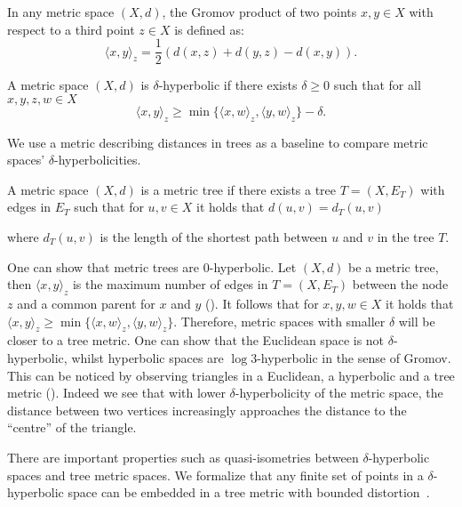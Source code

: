 \begin{definition}
    In any metric space $(X,d)$, the Gromov product of two points $x,y\in X$ with respect to a third point $z\in X$ is defined as:
    \begin{equation*}
        \langle x,y \rangle_z = \frac{1}{2}\left(d(x,z) + d(y,z) - d(x,y)\right).
    \end{equation*}
\end{definition}

\begin{definition}
    A metric space $(X,d)$ is $\delta$-hyperbolic if there exists $\delta\geq0$ such that for all $x,y,z,w\in X$
    \begin{equation*}
        \langle x,y\rangle_z \geq \min\{\langle x,w\rangle_z, \langle y, w\rangle_z\} - \delta.
    \end{equation*}
\end{definition}

We use a metric describing distances in trees as a baseline to compare metric spaces' $\delta$-hyperbolicities.

\begin{definition}
    A metric space $(X,d)$ is a metric tree if there exists a tree $T=(X,E_T)$ with edges in $E_T$ such that for $u,v\in X$ it holds that $d(u,v)=d_T(u,v)$
\end{definition}
where $d_T(u,v)$ is the length of the shortest path between $u$ and $v$ in the tree $T$. 
 


One can show that metric trees are $0$-hyperbolic. Let $(X,d)$ be a metric tree, then $\langle x, y\rangle_z$ is the maximum number of edges in $T=(X,E_T)$ between the node $z$ and a common parent for $x$ and $y$ (). It follows that for $x,y,w\in X$ it holds that $\langle x,y\rangle_z \geq \min\{\langle x,w\rangle_z, \langle y, w\rangle_z\}$. Therefore, metric spaces with smaller $\delta$ will be closer to a tree metric. One can show that the Euclidean space is not $\delta$-hyperbolic, whilst hyperbolic spaces are $\log 3$-hyperbolic in the sense of Gromov. This can be noticed by observing triangles in a Euclidean, a hyperbolic and a tree metric (). Indeed we see that with lower $\delta$-hyperbolicity of the metric space, the distance between two vertices increasingly approaches the distance to the ``centre'' of the triangle.

There are important properties such as quasi-isometries between $\delta$-hyperbolic spaces and tree metric spaces. We formalize that any finite set of points in a $\delta$-hyperbolic space can be embedded in a tree metric with bounded distortion~\cite{gromov1987hyperbolic}.

